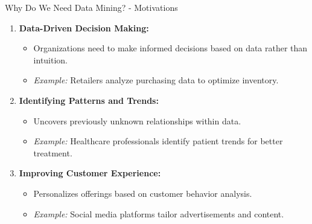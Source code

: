 \documentclass[aspectratio=169]{beamer}
\begin{document}
\begin{frame}[fragile]{Why Do We Need Data Mining? - Motivations}
    \begin{enumerate}
        \item \textbf{Data-Driven Decision Making:}
            \begin{itemize}
                \item Organizations need to make informed decisions based on data rather than intuition.
                \item \textit{Example:} Retailers analyze purchasing data to optimize inventory.
            \end{itemize}

        \item \textbf{Identifying Patterns and Trends:}
            \begin{itemize}
                \item Uncovers previously unknown relationships within data.
                \item \textit{Example:} Healthcare professionals identify patient trends for better treatment.
            \end{itemize}
    
        \item \textbf{Improving Customer Experience:}
            \begin{itemize}
                \item Personalizes offerings based on customer behavior analysis.
                \item \textit{Example:} Social media platforms tailor advertisements and content.
            \end{itemize}
    \end{enumerate}
\end{frame}
\end{document}
